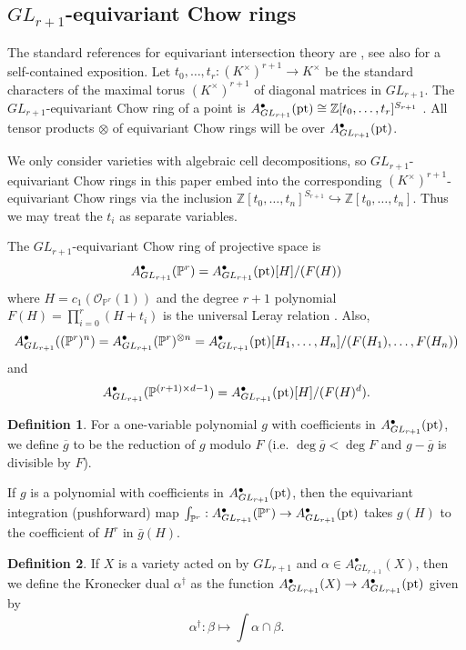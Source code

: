 \documentclass[12pt]{amsart}
\newcommand{\mb}{\mathbb}
\newcommand{\ms}{\mathscr}
\newcommand{\pt}{{\rm pt}}
\theoremstyle{plain}
\theoremstyle{definition}
\newtheorem{Def}{Definition}[section]
\theoremstyle{remark}
\begin{document}
\subsection{$GL_{r+1}$-equivariant Chow rings}
\label{Chowring}
The standard references for equivariant intersection theory are \cite{EG98,EG98b}, see also \cite{A12} for a self-contained exposition. Let $t_0,\ldots,t_r:(K^\times)^{r+1}\to K^\times$ be the standard characters of the maximal torus $(K^\times)^{r+1}$ of diagonal matrices in $GL_{r+1}$. The $GL_{r+1}$-equivariant Chow ring of a point is $A^\bullet_{GL_{r+1}}(\pt) \cong \mb{Z}[t_0,\ldots,t_r]^{S_{r+1}}$ \cite[Section 3.2]{EG98}. All tensor products $\otimes$ of equivariant Chow rings will be over $A^\bullet_{GL_{r+1}}(\pt)$.

We only consider varieties with algebraic cell decompositions, so $GL_{r+1}$-equivariant Chow rings in this paper embed into the corresponding $(K^\times)^{r+1}$-equivariant Chow rings via the inclusion $\mb{Z}[t_0,\ldots,t_n]^{S_{r+1}} \hookrightarrow \mb{Z}[t_0,\ldots,t_n]$. Thus we may treat the $t_i$ as separate variables.

The $GL_{r+1}$-equivariant Chow ring of projective space is $$A^\bullet_{GL_{r+1}}(\mb{P}^r) =  A^\bullet_{GL_{r+1}}(\pt)[H]/(F(H))$$ where $H=c_1(\ms{O}_{\mb{P}^r}(1))$ and the degree $r+1$ polynomial $F(H)=\prod_{i=0}^r (H+t_i)$ is the universal Leray relation \cite[Section 3.3]{EG98}. Also, \[A^\bullet_{GL_{r+1}}((\mb{P}^r)^n) = A^\bullet_{GL_{r+1}}(\mb{P}^r)^{\otimes n} = A^\bullet_{GL_{r+1}}(\pt)[H_1,\ldots,H_n]/(F(H_1),\ldots,F(H_n))\] and \[A^\bullet_{GL_{r+1}}(\mb{P}^{(r+1)\times d-1}) = A^\bullet_{GL_{r+1}}(\pt)[H]/(F(H)^d).\]
\begin{Def}
\label{reducedef}
For a one-variable polynomial $g$ with coefficients in $A^\bullet_{GL_{r+1}}(\pt)$, we define $\overline{g}$ to be the reduction of $g$ modulo $F$ (i.e. $\deg \overline{g}<\deg F$ and $g-\overline{g}$ is divisible by $F$).
\end{Def}
If $g$ is a polynomial with coefficients in $A^\bullet_{GL_{r+1}}(\pt)$, then the equivariant integration (pushforward) map $\int_{\mb{P}^r}:A^\bullet_{GL_{r+1}}(\mb{P}^r) \to  A^\bullet_{GL_{r+1}}(\pt)$ takes $g(H)$ to the coefficient of $H^r$ in $\bar{g}(H)$.

\begin{Def}
\label{dualdef}
If $X$ is a variety acted on by $GL_{r+1}$ and $\alpha \in A^\bullet_{GL_{r+1}}(X)$, then we define the Kronecker dual
$\alpha^{\dagger}$ as the function $A^\bullet_{GL_{r+1}}(X) \to A^\bullet_{GL_{r+1}}(\pt)$ given by
$$\alpha^{\dagger}:\beta \mapsto \int \alpha\cap\beta.$$
\end{Def}
\end{document}

